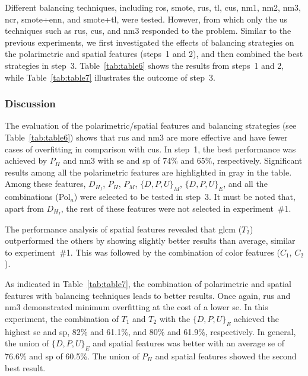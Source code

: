 Different balancing techniques, including \ac{ros}, \ac{smote}, \ac{rus}, \ac{tl}, \ac{cus}, \ac{nm1}, \ac{nm2}, \ac{nm3}, \ac{ncr}, \ac{smote}+\ac{enn}, and \ac{smote}+\ac{tl}, were tested.
However, from which only the \ac{us} techniques such as \ac{rus}, \ac{cus}, and \ac{nm3} responded to the problem.
Similar to the previous experiments, we first investigated the effects of balancing strategies on the polarimetric and spatial features (steps~1 and 2), and then combined the best strategies in step~3.
Table~\ref{tab:table6} shows the results from steps~1 and 2, while Table~\ref{tab:table7} illustrates the outcome of step~3.



\subsubsection{Discussion}
The evaluation of the polarimetric/spatial features and balancing strategies (see Table~\ref{tab:table6}) shows that \ac{rus} and \ac{nm3} are more effective and have fewer cases of overfitting in comparison with \ac{cus}. 
In step~1, the best performance was achieved by $P_{H}$ and \ac{nm3} with \ac{se} and \ac{sp} of 74\% and 65\%, respectively. 
Significant results among all the polarimetric features are highlighted in gray in the table.
Among these features, $D_{H_{I}}$, $P_{H}$, $P_{M}$, $\{D,P,U\}_{M}$, $\{D,P,U\}_{E}$, and all the combinations (Pol$_{a}$) were selected to be tested in step~3.
It must be noted that, apart from $D_{H_{I}}$, the rest of these features were not selected in experiment~\#1.

The performance analysis of spatial features revealed that \ac{glcm} ($T_{2}$) outperformed the others by showing slightly better results than average, similar to experiment~\#1. 
This was followed by the combination of color features ($C_{1}$, $C_{2}$).

As indicated in Table~\ref{tab:table7}, the combination of polarimetric and spatial features with balancing techniques leads to better results.
Once again, \ac{rus} and \ac{nm3} demonstrated minimum overfitting at the cost of a lower \ac{se}. 
In this experiment, the combination of $T_{1}$ and $T_{2}$ with the $\{D,P,U\}_{E}$ achieved the highest \ac{se} and \ac{sp}, 82\% and 61.1\%, and 80\% and 61.9\%, respectively.
In general, the union of $\{D,P,U\}_{E}$ and spatial features was better with an average \ac{se} of 76.6\% and \ac{sp} of 60.5\%.
The union of $P_{H}$ and spatial features showed the second best result.

